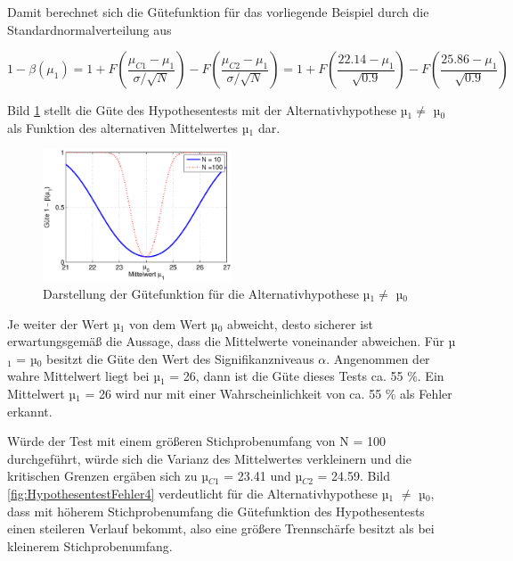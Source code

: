\noindent Damit berechnet sich die G\"{u}tefunktion f\"{u}r das vorliegende Beispiel durch die Standardnormalverteilung aus 

\begin{equation}\label{eq:sixseventyfour}
1-\beta \left(\mu _{1} \right)=1+F\left(\dfrac{\mu _{C1} -\mu _{1} }{\sigma /\sqrt{N} } \right)-F\left(\dfrac{\mu _{C2} -\mu _{1} }{\sigma /\sqrt{N} } \right)=1+F\left(\dfrac{22.14-\mu _{1} }{\sqrt{0.9} } \right)-F\left(\dfrac{25.86-\mu _{1} }{\sqrt{0.9} } \right)
\end{equation}

\noindent Bild \ref{fig:HypothesentestFehler3} stellt die G\"{u}te des Hypothesentests mit der Alternativhypothese µ$_{1} \neq$ µ$_{0}$ als Funktion des alternativen Mittelwertes µ$_{1}$ dar. 

\noindent 
\begin{figure}[H]
  \centerline{\includegraphics[width=0.5\textwidth]{Kapitel6/Bilder/image12}}
  \caption{Darstellung der G\"{u}tefunktion f\"{u}r die Alternativhypothese µ$_{1} \neq$ µ$_{0}$}
  \label{fig:HypothesentestFehler3}
\end{figure}

\noindent Je weiter der Wert µ$_{1}$ von dem Wert µ$_{0}$ abweicht, desto sicherer ist erwartungsgem\"{a}{\ss} die Aussage, dass die Mittelwerte voneinander abweichen. F\"{u}r µ$_{1}$ = µ$_{0}$ besitzt die G\"{u}te den Wert des Signifikanzniveaus $\alpha$. Angenommen der wahre Mittelwert liegt bei µ$_{1}$ = 26, dann ist die G\"{u}te dieses Tests ca. 55 \%. Ein Mittelwert µ$_{1}$ = 26 wird nur mit einer Wahrscheinlichkeit von ca. 55 \% als Fehler erkannt.\newline

\noindent W\"{u}rde der Test mit einem gr\"{o}{\ss}eren Stichprobenumfang von N = 100 durchgef\"{u}hrt, w\"{u}rde sich die Varianz des Mittelwertes verkleinern und die kritischen Grenzen erg\"{a}ben sich zu µ$_{C1}$ = 23.41 und µ$_{C2}$ = 24.59. Bild \ref{fig:HypothesentestFehler4} verdeutlicht f\"{u}r die Alternativhypothese µ$_{1}$ $\neq$ µ${}_{0}$, dass mit h\"{o}herem Stichprobenumfang die G\"{u}tefunktion des Hypothesentests einen steileren Verlauf bekommt, also eine gr\"{o}{\ss}ere Trennsch\"{a}rfe besitzt als bei kleinerem Stichprobenumfang. 

